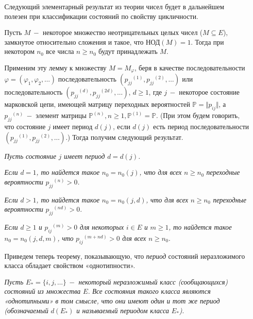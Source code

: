 Следующий элементарный результат из теории чисел будет в дальнейшем полезен при классификации состояний по свойству цикличности.

\begin{lemma} Пусть $M~-$ некоторое множество неотрицательных
целых чисел ($M \subseteq E$), замкнутое относительно сложения и такое,
что НОД$(M) = 1$. Тогда при некотором $n_0$ все числа $n \geq n_0$ будут принадлежать $M$.
\end{lemma}

Применим эту лемму к множеству $M = M_{\varphi}$, беря в качестве последовательности $\varphi = (\varphi_1, \varphi_2, \ldots)$ последовательность $({p_{jj}}^{(1)}, {p_{jj}}^{(2)}, \ldots)$ или последовательность $({p_{jj}}^{(d)}, {p_{jj}}^{(2d)}, \ldots)$, $d \geq 1$, где $j~-$ некоторое состояние марковской цепи, имеющей матрицу переходных вероятностей $\mathbb{P} = \Vert p_{ij} \Vert$, а ${p_{jj}}^{(n)}~-$ элемент матрицы ${\mathbb{P}}^{(n)}, n \geq 1, {\mathbb{P}}^{(1)} = \mathbb{P}$. (При этом будем говорить, что
состояние $j$ имеет период $d(j)$, если $d(j)$ есть период последовательности
$({p_{jj}}^{(1)}, {p_{jj}}^{(2)}, \ldots)$.)  Тогда получим следующий результат.

\begin{theorem} \emph{Пусть состояние $j$ имеет период $d = d(j)$.}

\emph{Если $d = 1$, то найдется такое $n_0 = n_0 (j)$, что для всех $n \geq n_0$ переходные вероятности ${p_{jj}}^{(n)} > 0$.}

\emph{Если $d > 1$, то найдется такое $n_0 = n_0 (j, d)$, что для всех $n \geq n_0$ переходные вероятности ${p_{jj}}^{(nd)} > 0$.}

\emph{Если $d \geq 1$ и ${p_{ij}}^{(m)} > 0$ для некоторых $i \in E$ и $m \geq 1$, то найдется такое $n_0 = n_0(j, d, m)$, что ${p_{ij}}^{(m + nd)} > 0$  для всех $n \geq n_0$.}
\end{theorem}

Приведем теперь теорему, показывающую, что \emph{период} состояний неразложимого класса обладает свойством «однотипности».

\begin{theorem} \emph{Пусть ${E}_* =\{i, j, \ldots \}~-$ некоторый неразложимый класс (сообщающихся) состояний из множества $E$.}
\emph{Все состояния такого класса являются «однотипными» в том
смысле, что они имеют один и тот же период (обозначаемый $d(E_*)$
и называемый периодом класса $E_*$).}
\end{theorem}


